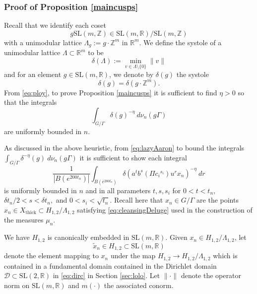 \documentclass[10pt,reqno]{amsart}
\theoremstyle{Theorem}
\newtheorem{proposition}[theorem]{Proposition}
\theoremstyle{definition}
\theoremstyle{remark}
\newcommand{\noted}[1]{\marginpar{{\color{blue}\footnotesize \begin{spacing}{1}#1\end{spacing}}}}
\newcommand{\td}{\tilde}
\newcommand{\R}{\mathbb {R}}
\newcommand{\Z}{\mathbb {Z}}
\newcommand{\Xt}{X_{\mathrm{thick}}}
\newcommand{\Sl}{\mathrm{SL}}
\def\SL{\Sl}
\def\blue{}
\begin{document}
\subsubsection{Proof of Proposition \ref{maincusps}}
Recall that we identify   each coset $$g\Sl(m,\Z) \in \Sl(m,\R)/\Sl(m,\Z)$$ with a unimodular lattice
$\Lambda_g:= g\cdot \Z^m$ in $\R^m$.  We define the systole of a unimodular lattice $\Lambda\subset \R^m$ to be  $$\delta(\Lambda) := \min_{v \in \Lambda \setminus \{0\}} \|v\|$$ and for an element $g\in \Sl(m,\R)$,   we denote by $\delta(g)$ the systole $$\delta(g) = \delta(g\cdot \Z^m).$$ From \eqref{eq:ploy}, to prove Proposition \ref{maincusps} it is sufficient to find $\eta>0$ so that the  integrals $$\int_{G/\Gamma} \delta(g)^{-\eta}  \ d \nu_n(g\Gamma)$$
are uniformly bounded in $n$.

As discussed in the above heuristic, from \eqref{eq:lazyAaron} to bound the integrals $\int_{G/\Gamma} \delta^{-\eta}(g)  \ d \nu_n(g\Gamma)$ it is sufficient to show each integral $${\frac{1}{|B(e^{200t_n})|}}\int_{B(e^{200t_n})}  \delta(a^tb^s (\Pi {c_i}^{s_i})u^r   x_n)^{-\eta} \  dr$$
is uniformly bounded in $n$ and in all parameters $t,s, s_i$ for $0<t<t_n,$
$ \delta t_n/2<s < \delta t_n,$ and $
0 < s_i <  \sqrt{t_n}.$
Recall here that $  x_n\in G/\Gamma$ are the points  $x_n\in \Xt\subset H_{1,2}/\Lambda_{1,2}$   satisfying \eqref{eq:cleansingDeluge} used in the construction of the measures $\mu_n$.


{\blue We have $H_{1,2}$ is canonically embedded in $\Sl(m,\R)$.   Given $x_n\in H_{1,2}/\Lambda_{1,2}$, let $$\td x_n\in H_{1,2}\subset \Sl(m,\R)$$ denote the element   mapping to $  x_n$ under the map $H_{1,2}\to H_{1,2}/\Lambda_{1,2}$ which is contained in a fundamental domain contained in the Dirichlet domain $\mathcal D\subset \SL(2,\R)$  in \eqref{eq:dirc} in Section \ref{sec:lolo}.}  Let $\|\cdot \|$ denote the operator norm on $\Sl(m,\R)$ and $m(\cdot )$ the associated conorm.

\end{document}
